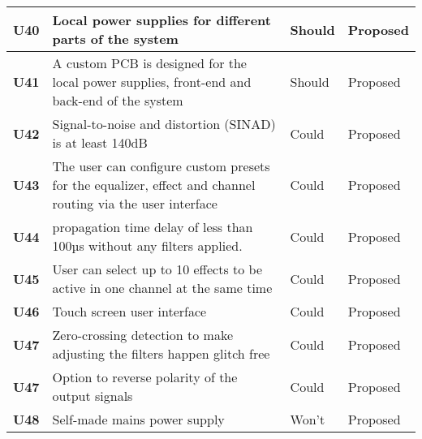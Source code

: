 \begin{longtable}{|l|p{10cm}|l|l|}
	\textbf{U40} &Local power supplies for different parts of the system 										& Should & Proposed\\ \hline
	\textbf{U41} &A custom PCB is designed for the local power supplies, front-end and back-end of the system				& Should & Proposed\\ \hline
	\textbf{U42} &Signal-to-noise and distortion (SINAD) is at least 140dB 										& Could  & Proposed\\ \hline
	\textbf{U43} &The user can configure custom presets for the equalizer, effect and channel routing via the user interface	& Could  & Proposed\\ \hline
	\textbf{U44} &propagation time delay of less than 100µs without any filters applied. 							& Could  & Proposed\\ \hline
	\textbf{U45} &User can select up to 10 effects to be active in one channel at the same time 						& Could  & Proposed\\ \hline
	\textbf{U46} &Touch screen user interface 														& Could  & Proposed\\ \hline
	\textbf{U47} &Zero-crossing detection to make adjusting the filters happen glitch free							& Could  & Proposed\\ \hline
	\textbf{U47} &Option to reverse polarity of the output signals											& Could  & Proposed\\ \hline
	\textbf{U48} &Self-made mains power supply  														& Won't  & Proposed\\ \hline
\end{longtable}